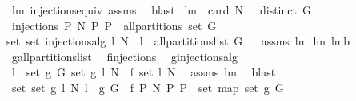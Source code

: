 \begin{isabellebody}
%
\isadelimproof
%
\endisadelimproof
%
\isatagproof
{}\isamarkupfalse%
\ lm{}{}\ injections{\isacharunderscore}equiv\ assms\ \isamarkupfalse%
\ blast%
\endisatagproof
{\isafoldproof}%
%
\isadelimproof
\isanewline
%
\endisadelimproof
\isanewline
{}\isamarkupfalse%
\ lm{}{}{\isacharcolon}\ \ {\isachardoublequoteopen}card\ N\ {\isachargreater}\ {}{\isachardoublequoteclose}\ {\isachardoublequoteopen}distinct\ G{\isachardoublequoteclose}\isanewline
{}\ {\isachardoublequoteopen}{\isacharbraceleft}injections\ P\ N{\isacharbar}\ P{\isachardot}\ P\ {\isasymin}\ all{\isacharunderscore}partitions\ {\isacharparenleft}set\ G{\isacharparenright}{\isacharbraceright}\ {\isacharequal}\isanewline
set\ {\isacharbrackleft}set\ {\isacharparenleft}injections{\isacharunderscore}alg\ l\ N{\isacharparenright}\ {\isachardot}\ l\ {\isasymleftarrow}\ all{\isacharunderscore}partitions{\isacharunderscore}list\ G{\isacharbrackright}{\isachardoublequoteclose}%
\isadelimproof
\ %
\endisadelimproof
%
\isatagproof
{}\isamarkupfalse%
\ assms\ lm{}{}\ lm{}{}\ lm{}{}b\ \isanewline
{}\isamarkupfalse%
\ {\isacharminus}\isanewline
\ \ \isamarkupfalse%
\ {\isacharquery}g{}{\isacharequal}all{\isacharunderscore}partitions{\isacharunderscore}list\ \isamarkupfalse%
\ {\isacharquery}f{}{\isacharequal}injections\ \isamarkupfalse%
\ {\isacharquery}g{}{\isacharequal}injections{\isacharunderscore}alg\isanewline
\ \ \isamarkupfalse%
\ {\isachardoublequoteopen}{\isasymforall}l\ {\isasymin}\ set\ {\isacharparenleft}{\isacharquery}g{}\ G{\isacharparenright}{\isachardot}\ set\ {\isacharparenleft}{\isacharquery}g{}\ l\ N{\isacharparenright}\ {\isacharequal}\ {\isacharquery}f{}\ {\isacharparenleft}set\ l{\isacharparenright}\ N{\isachardoublequoteclose}\ \isamarkupfalse%
\ assms\ lm{}{}\ \isamarkupfalse%
\ blast\isanewline
\ \ \isamarkupfalse%
\ \isamarkupfalse%
\ {\isachardoublequoteopen}set\ {\isacharbrackleft}set\ {\isacharparenleft}{\isacharquery}g{}\ l\ N{\isacharparenright}{\isachardot}\ l\ {\isacharless}{\isacharminus}\ {\isacharquery}g{}\ G{\isacharbrackright}\ {\isacharequal}\ {\isacharbraceleft}{\isacharquery}f{}\ P\ N{\isacharbar}\ P{\isachardot}\ P\ {\isasymin}\ set\ {\isacharparenleft}map\ set\ {\isacharparenleft}{\isacharquery}g{}\ G{\isacharparenright}{\isacharparenright}{\isacharbraceright}{\isachardoublequoteclose}\ \isamarkupfalse%

\end{isabellebody}
